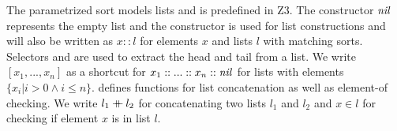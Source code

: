The parametrized sort  models lists and
is predefined in Z3.
The constructor $\mathit{nil}$ represents the empty list and
the constructor  is used for list constructions
and  will also be written as $x :: l$
for elements $x$ and lists $l$ with matching sorts.
Selectors  and  are used to extract
the head and tail from a list.
We write $[x_1, ..., x_n]$ as a shortcut for
$x_1 :: ... :: x_n :: \mathit{nil}$ for lists with elements $\{x_i | i > 0 \land i \leq n\}$.
 defines functions for list concatenation
as well as element-of checking.
We write $l_1 \mathbin{+\mkern-10mu+} l_2$ for concatenating two lists $l_1$ and $l_2$
and $x \in l$ for checking if element $x$ is in list $l$.







